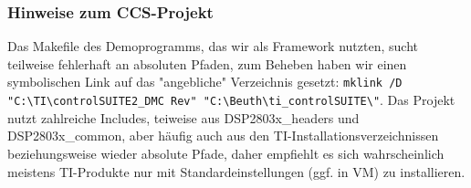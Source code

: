  \subsubsection{Hinweise zum CCS-Projekt}
  Das Makefile des Demoprogramms, das wir als Framework nutzten, sucht teilweise fehlerhaft  an absoluten Pfaden, zum Beheben haben wir einen symbolischen Link auf das "angebliche" Verzeichnis gesetzt: {\lstinline[breaklines=true]$mklink /D "C:\TI\controlSUITE2_DMC Rev" "C:\Beuth\ti_controlSUITE\"$}. Das Projekt nutzt zahlreiche Includes, teiweise aus DSP2803x\_headers und DSP2803x\_common, aber häufig auch aus den TI-Installationsverzeichnissen beziehungsweise wieder absolute Pfade, daher empfiehlt es sich wahrscheinlich meistens TI-Produkte nur mit Standardeinstellungen (ggf. in VM) zu installieren. 
 
